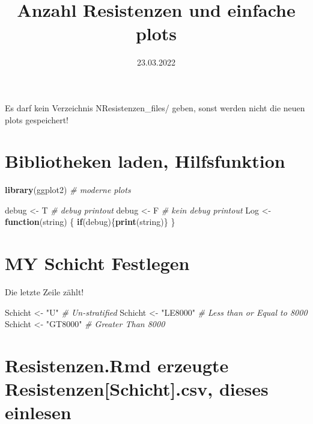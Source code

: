 \documentclass[
]{article}
\title{Anzahl Resistenzen und einfache plots}
\author{}
\date{\vspace{-2.5em}23.03.2022}
\newenvironment{Shaded}{\begin{snugshade}}{\end{snugshade}}
\newcommand{\CommentTok}[1]{\textcolor[rgb]{0.56,0.35,0.01}{\textit{#1}}}
\newcommand{\ControlFlowTok}[1]{\textcolor[rgb]{0.13,0.29,0.53}{\textbf{#1}}}
\newcommand{\KeywordTok}[1]{\textcolor[rgb]{0.13,0.29,0.53}{\textbf{#1}}}
\newcommand{\NormalTok}[1]{#1}
\newcommand{\StringTok}[1]{\textcolor[rgb]{0.31,0.60,0.02}{#1}}
\begin{document}
\maketitle

Es darf kein Verzeichnis NResistenzen\_files/ geben, sonst werden nicht
die neuen plots gespeichert!

\hypertarget{bibliotheken-laden-hilfsfunktion}{%
\section{Bibliotheken laden,
Hilfsfunktion}\label{bibliotheken-laden-hilfsfunktion}}

\begin{Shaded}
\begin{Highlighting}[]
\KeywordTok{library}\NormalTok{(ggplot2)     }\CommentTok{# moderne plots}

\NormalTok{debug <-}\StringTok{ }\NormalTok{T           }\CommentTok{# debug printout}
\NormalTok{debug <-}\StringTok{ }\NormalTok{F           }\CommentTok{# kein debug printout}
\NormalTok{Log <-}\StringTok{ }\ControlFlowTok{function}\NormalTok{(string) \{}
  \ControlFlowTok{if}\NormalTok{(debug)\{}\KeywordTok{print}\NormalTok{(string)\}  }
\NormalTok{\}}
\end{Highlighting}
\end{Shaded}

\hypertarget{my-schicht-festlegen}{%
\section{MY Schicht Festlegen}\label{my-schicht-festlegen}}

Die letzte Zeile zählt!

\begin{Shaded}
\begin{Highlighting}[]
\NormalTok{Schicht <-}\StringTok{ "U"}         \CommentTok{# Un-stratified}
\NormalTok{Schicht <-}\StringTok{ "LE8000"}    \CommentTok{# Less than or Equal to 8000}
\NormalTok{Schicht <-}\StringTok{ "GT8000"}    \CommentTok{# Greater Than 8000}
\end{Highlighting}
\end{Shaded}

\hypertarget{resistenzen.rmd-erzeugte-resistenzenschicht.csv-dieses-einlesen}{%
\section{Resistenzen.Rmd erzeugte Resistenzen{[}Schicht{]}.csv, dieses
einlesen}\label{resistenzen.rmd-erzeugte-resistenzenschicht.csv-dieses-einlesen}}
\end{document}
